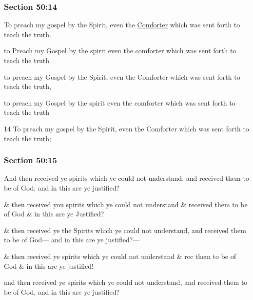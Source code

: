 	\subsubsection{Section 50:14} %
		\label{DC50-14}

		To preach my gospel by the Spirit, even the \hyperref[COMFORTER]{Comforter} which was sent forth to teach the truth.

		\begin{framed}
		\scriptsize
			\begin{compactdesc}
				\item[JSP] to Preach my Gospel by the spirit even the comforter which was sent forth to teach the truth
				\item[Gilbert] to preach my Gospel by the Spirit, even the Comforter which was sent forth to teach the truth,
				\item[Hyde and Smith] to preach my Gospel by the spirit even the comforter which was sent forth to teach the truth
				\item[BC] 14 To preach my gospel by the Spirit, even the Comforter which was sent forth to teach the truth;
			\end{compactdesc}
		\end{framed}

	\subsubsection{Section 50:15} %
		\label{DC50-15}

		And then received ye spirits which ye could not understand, and received them to be of God; and in this are ye justified?

		\begin{framed}
		\scriptsize
			\begin{compactdesc}
				\item[JSP] \& then received you spirits which ye could not understand \& received them to be of God \& in this are ye Justified?
				\item[Gilbert] \& then received ye the Spirits which ye could not understand, and received them to be of God--- and in this are ye justified?---
				\item[Hyde and Smith] \& then received ye spirits which ye could not understand \& rec them to be of God \& in this are ye justified!
				\item[BC] and then received ye spirits which ye could not understand, and received them to be of God, and in this are ye justified?
			\end{compactdesc}
		\end{framed}

